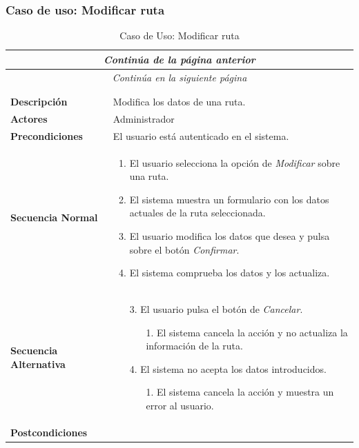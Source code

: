 \newpage
\subsubsection*{Caso de uso: Modificar ruta }
\begin{longtable}{| p{4cm} | p{10cm} |}
\endfirsthead
\multicolumn{2}{c}{\textit{Continúa de la página anterior}}\\[12pt]
\hline
\endhead
\hline
\multicolumn{2}{c}{\textit{Continúa en la siguiente página}} \\
\endfoot
\hline
\caption{Caso de Uso: Modificar ruta}\label{fig:1}\\
\endlastfoot


\hline
\multicolumn{2}{|c|}{\textbf{CU$<$28$>$ - Modificar Ruta}} \\

\hline
\textbf{Descripción} &
Modifica los datos de una ruta.\\

\hline
\textbf{Actores} &
Administrador\\

\hline
\textbf{Precondiciones} &
El usuario está autenticado en el sistema.\\

\hline
\textbf{Secuencia Normal} &\mbox{}\par\vspace{-\baselineskip}
\begin{enumerate}[leftmargin=0.7cm, topsep=0.1cm]
\item El usuario selecciona la opción de \textit{Modificar} sobre una ruta.
\item El sistema muestra un formulario con los datos actuales de la ruta seleccionada.
\item El usuario modifica los datos que desea y pulsa sobre el botón \textit{Confirmar}.
\item El sistema comprueba los datos y los actualiza.
\end{enumerate}


\\
\hline
\textbf{Secuencia Alternativa} &\mbox{}\par\vspace{-\baselineskip}
\begin{enumerate}[leftmargin=0.9cm, topsep=0.1cm]
\item[3.] El usuario pulsa el botón de \textit{Cancelar}.
	\begin{itemize}
	\item[1.] El sistema cancela la acción y no actualiza la información de la ruta.
	\end{itemize}
\item[4.] El sistema no acepta los datos introducidos.
	\begin{itemize}
	\item[1.] El sistema cancela la acción y muestra un error al usuario.
	\end{itemize}
\end{enumerate}
\\

\hline
\textbf{Postcondiciones} & \\
\hline
\end{longtable}



